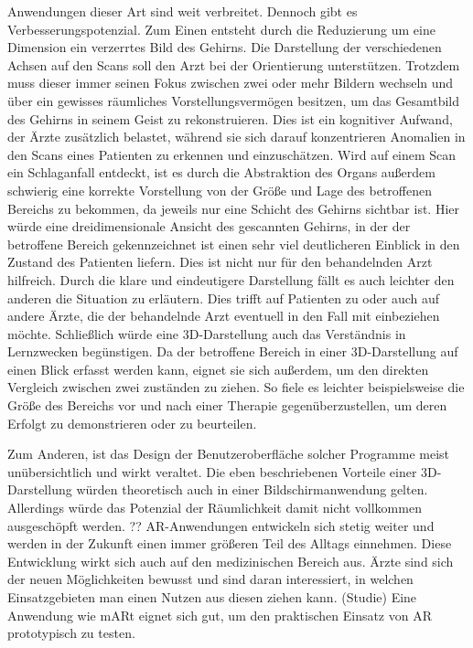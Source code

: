 Anwendungen dieser Art sind weit verbreitet. Dennoch gibt es Verbesserungspotenzial.
Zum Einen entsteht durch die Reduzierung um eine Dimension ein verzerrtes Bild des Gehirns. Die Darstellung der verschiedenen Achsen auf den Scans soll den Arzt bei der Orientierung unterstützen. Trotzdem muss dieser immer seinen Fokus zwischen zwei oder mehr Bildern wechseln und über ein gewisses räumliches Vorstellungsvermögen besitzen, um das Gesamtbild des Gehirns in seinem Geist zu rekonstruieren. Dies ist ein kognitiver Aufwand, der Ärzte zusätzlich belastet, während sie sich darauf konzentrieren Anomalien in den Scans eines Patienten zu erkennen und einzuschätzen. 
Wird auf einem Scan ein Schlaganfall entdeckt, ist es durch die Abstraktion des Organs außerdem schwierig eine korrekte Vorstellung von der Größe und Lage des betroffenen Bereichs zu bekommen, da jeweils nur eine Schicht des Gehirns sichtbar ist. 
Hier würde eine dreidimensionale Ansicht des gescannten Gehirns, in der der betroffene Bereich gekennzeichnet ist einen sehr viel deutlicheren Einblick in den Zustand des Patienten liefern. Dies ist nicht nur für den behandelnden Arzt hilfreich. Durch die klare und eindeutigere Darstellung fällt es auch leichter den anderen die Situation zu erläutern. Dies trifft auf Patienten zu oder auch auf andere Ärzte, die der behandelnde Arzt eventuell in den Fall mit einbeziehen möchte. Schließlich würde eine 3D-Darstellung auch das Verständnis in Lernzwecken begünstigen.
Da der betroffene Bereich in einer 3D-Darstellung auf einen Blick erfasst werden kann, eignet sie sich außerdem, um den direkten Vergleich zwischen zwei zuständen zu ziehen. So fiele es leichter beispielsweise die Größe des Bereichs vor und nach einer Therapie gegenüberzustellen, um deren Erfolgt zu demonstrieren oder zu beurteilen.

Zum Anderen, ist das Design der Benutzeroberfläche solcher Programme meist unübersichtlich und wirkt veraltet. 
Die eben beschriebenen Vorteile einer 3D-Darstellung würden theoretisch auch in einer Bildschirmanwendung gelten. Allerdings würde das Potenzial der Räumlichkeit damit nicht vollkommen ausgeschöpft werden. 
??
AR-Anwendungen entwickeln sich stetig weiter und werden in der Zukunft einen immer größeren Teil des Alltags einnehmen. Diese Entwicklung wirkt sich auch auf den medizinischen Bereich aus. 
Ärzte sind sich der neuen Möglichkeiten bewusst und sind daran interessiert, 
in welchen Einsatzgebieten man einen Nutzen aus diesen ziehen kann. (Studie)
Eine Anwendung wie mARt eignet sich gut, um den praktischen Einsatz von AR prototypisch zu testen.

